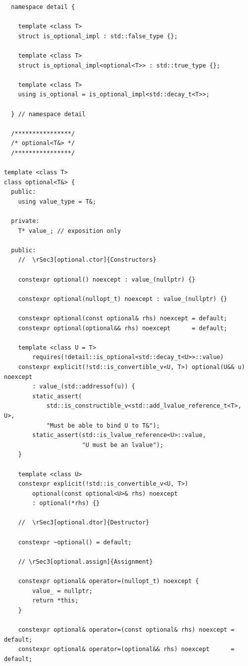\documentclass[a4paper,10pt,oneside,openany,final,article]{memoir}
\begin{document}
\begin{verbatim}
  namespace detail {

    template <class T>
    struct is_optional_impl : std::false_type {};

    template <class T>
    struct is_optional_impl<optional<T>> : std::true_type {};

    template <class T>
    using is_optional = is_optional_impl<std::decay_t<T>>;

  } // namespace detail

  /****************/
  /* optional<T&> */
  /****************/

template <class T>
class optional<T&> {
  public:
    using value_type = T&;

  private:
    T* value_; // exposition only

  public:
    //  \rSec3[optional.ctor]{Constructors}

    constexpr optional() noexcept : value_(nullptr) {}

    constexpr optional(nullopt_t) noexcept : value_(nullptr) {}

    constexpr optional(const optional& rhs) noexcept = default;
    constexpr optional(optional&& rhs) noexcept      = default;

    template <class U = T>
        requires(!detail::is_optional<std::decay_t<U>>::value)
    constexpr explicit(!std::is_convertible_v<U, T>) optional(U&& u) noexcept
        : value_(std::addressof(u)) {
        static_assert(
            std::is_constructible_v<std::add_lvalue_reference_t<T>, U>,
            "Must be able to bind U to T&");
        static_assert(std::is_lvalue_reference<U>::value,
                      "U must be an lvalue");
    }

    template <class U>
    constexpr explicit(!std::is_convertible_v<U, T>)
        optional(const optional<U>& rhs) noexcept
        : optional(*rhs) {}

    //  \rSec3[optional.dtor]{Destructor}

    constexpr ~optional() = default;

    // \rSec3[optional.assign]{Assignment}

    constexpr optional& operator=(nullopt_t) noexcept {
        value_ = nullptr;
        return *this;
    }

    constexpr optional& operator=(const optional& rhs) noexcept = default;
    constexpr optional& operator=(optional&& rhs) noexcept      = default;


\end{verbatim}
\end{document}
